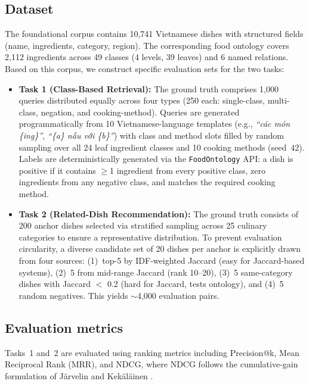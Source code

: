 \label{sec:experiments}


\subsection{Dataset}
\label{ssec:dataset}

The foundational corpus contains 10{,}741 Vietnamese dishes with structured fields (name, ingredients, category, region). The corresponding food ontology covers 2{,}112 ingredients across 49 classes (4 levels, 39 leaves) and 6 named relations. Based on this corpus, we construct specific evaluation sets for the two tasks:

\begin{itemize}
    \item \textbf{Task 1 (Class-Based Retrieval):} The ground truth comprises 1{,}000 queries distributed equally across four types (250 each: single-class, multi-class, negation, and cooking-method). Queries are generated programmatically from 10 Vietnamese-language templates (e.g., \textit{``các món \{ing\}''}, \textit{``\{a\} nấu với \{b\}''}) with class and method slots filled by random sampling over all 24 leaf ingredient classes and 10 cooking methods (seed~42). Labels are deterministically generated via the \texttt{FoodOntology} API: a dish is positive if it contains $\geq$1 ingredient from every positive class, zero ingredients from any negative class, and matches the required cooking method.
    
    \item \textbf{Task 2 (Related-Dish Recommendation):} The ground truth consists of 200 anchor dishes selected via stratified sampling across 25 culinary categories to ensure a representative distribution. To prevent evaluation circularity, a diverse candidate set of 20 dishes per anchor is explicitly drawn from four sources: (1)~top-5 by IDF-weighted Jaccard (easy for Jaccard-based systems), (2)~5 from mid-range Jaccard (rank 10--20), (3)~5 same-category dishes with Jaccard $<$ 0.2 (hard for Jaccard, tests ontology), and (4)~5 random negatives. This yields ${\sim}$4{,}000 evaluation pairs.
\end{itemize}

\subsection{Evaluation metrics}
Tasks~1 and~2 are evaluated using ranking metrics including Precision@k, Mean Reciprocal Rank (MRR), and NDCG, where NDCG follows the cumulative-gain formulation of J\"arvelin and Kek\"al\"ainen \cite{jarvelin2002cg}.

